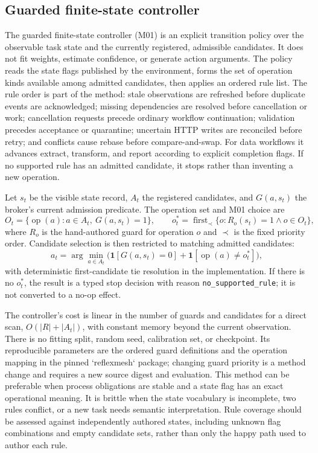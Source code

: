 \subsection{Guarded finite-state controller}\label{sec:method-m01}
The guarded finite-state controller (M01) is an explicit transition policy over the observable task state and the currently registered, admissible candidates. It does not fit weights, estimate confidence, or generate action arguments. The policy reads the state flags published by the environment, forms the set of operation kinds available among admitted candidates, then applies an ordered rule list. The rule order is part of the method: stale observations are refreshed before duplicate events are acknowledged; missing dependencies are resolved before cancellation or work; cancellation requests precede ordinary workflow continuation; validation precedes acceptance or quarantine; uncertain HTTP writes are reconciled before retry; and conflicts cause rebase before compare-and-swap. For data workflows it advances extract, transform, and report according to explicit completion flags. If no supported rule has an admitted candidate, it stops rather than inventing a new operation.

Let $s_t$ be the visible state record, $A_t$ the registered candidates, and $G(a,s_t)$ the broker's current admission predicate. The operation set and M01 choice are
\begin{equation}
O_t=\{\operatorname{op}(a):a\in A_t,\ G(a,s_t)=1\},\qquad
o_t^*=\operatorname{first}_{\prec}\{o:R_o(s_t)=1\land o\in O_t\},
\end{equation}
where $R_o$ is the hand-authored guard for operation $o$ and $\prec$ is the fixed priority order. Candidate selection is then restricted to matching admitted candidates:
\begin{equation}
a_t=\arg\min_{a\in A_t}\bigl(\mathbf{1}[G(a,s_t)=0]+\mathbf{1}[\operatorname{op}(a)\ne o_t^*]\bigr),
\end{equation}
with deterministic first-candidate tie resolution in the implementation. If there is no $o_t^*$, the result is a typed stop decision with reason \texttt{no\_supported\_rule}; it is not converted to a no-op effect.

The controller's cost is linear in the number of guards and candidates for a direct scan, $O(|R|+|A_t|)$, with constant memory beyond the current observation. There is no fitting split, random seed, calibration set, or checkpoint. Its reproducible parameters are the ordered guard definitions and the operation mapping in the pinned `reflexmesh` package; changing guard priority is a method change and requires a new source digest and evaluation. This method can be preferable when process obligations are stable and a state flag has an exact operational meaning. It is brittle when the state vocabulary is incomplete, two rules conflict, or a new task needs semantic interpretation. Rule coverage should be assessed against independently authored states, including unknown flag combinations and empty candidate sets, rather than only the happy path used to author each rule.

